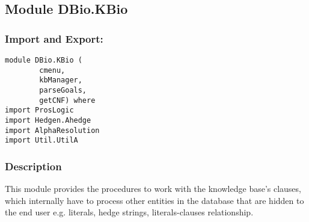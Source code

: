 \documentclass[../gr-final.tex]{subfiles}
\begin{document}
\subsection{Module DBio.KBio}
\subsubsection{Import and Export:}
\begin{lstlisting}
module DBio.KBio (
        cmenu,
        kbManager,
        parseGoals,
        getCNF) where
import ProsLogic
import Hedgen.Ahedge
import AlphaResolution
import Util.UtilA
\end{lstlisting}
\subsubsection{Description}
This module provides the procedures to work with the knowledge
base's clauses, which internally have to process other entities
in the database that are hidden to the end user e.g. literals, hedge
strings, literals-clauses relationship.
\end{document}

